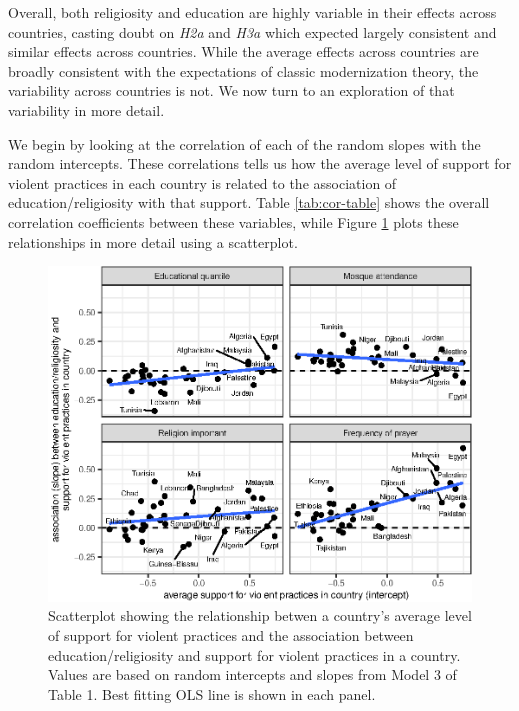 \documentclass[10pt,letterpaper]{article}
\begin{document}
Overall, both religiosity and education are highly variable in their effects across countries, casting doubt on \emph{H2a} and \emph{H3a} which expected largely consistent and similar effects across countries. While the average effects across countries are broadly consistent with the expectations of classic modernization theory, the variability across countries is not. We now turn to an exploration of that variability in more detail.

We begin by looking at the correlation of each of the random slopes with the random intercepts. These correlations tells us how the average level of support for violent practices in each country is related to the association of education/religiosity with that support. Table \ref{tab:cor-table} shows the overall correlation coefficients between these variables, while Figure \ref{fig:intercept-slope-plot} plots these relationships in more detail using a scatterplot.

\begin{figure}[!h]
\centering
\includegraphics{figures/fig4.eps}
\caption{Scatterplot showing the relationship betwen a country's average level of support for violent practices and the association between education/religiosity and support for violent practices in a country. Values are based on random intercepts and slopes from Model 3 of Table 1. Best fitting OLS line is shown in each panel.}
\label{fig:intercept-slope-plot}
\end{figure}
\end{document}
